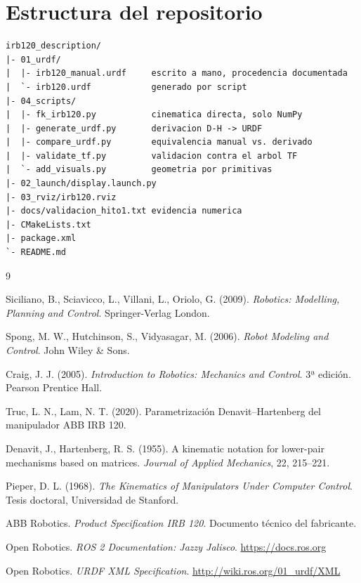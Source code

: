 \documentclass[11pt,a4paper]{article}
\begin{document}
\section{Estructura del repositorio}

\begin{lstlisting}[caption={Organización de archivos}]
irb120_description/
|- 01_urdf/
|  |- irb120_manual.urdf     escrito a mano, procedencia documentada
|  `- irb120.urdf            generado por script
|- 04_scripts/
|  |- fk_irb120.py           cinematica directa, solo NumPy
|  |- generate_urdf.py       derivacion D-H -> URDF
|  |- compare_urdf.py        equivalencia manual vs. derivado
|  |- validate_tf.py         validacion contra el arbol TF
|  `- add_visuals.py         geometria por primitivas
|- 02_launch/display.launch.py
|- 03_rviz/irb120.rviz
|- docs/validacion_hito1.txt evidencia numerica
|- CMakeLists.txt
|- package.xml
`- README.md
\end{lstlisting}

\begin{thebibliography}{9}

Siciliano, B., Sciavicco, L., Villani, L., Oriolo, G. (2009).
\emph{Robotics: Modelling, Planning and Control}. Springer-Verlag London.

Spong, M. W., Hutchinson, S., Vidyasagar, M. (2006).
\emph{Robot Modeling and Control}. John Wiley \& Sons.

Craig, J. J. (2005). \emph{Introduction to Robotics: Mechanics and
Control}. 3ª edición. Pearson Prentice Hall.

Truc, L. N., Lam, N. T. (2020). Parametrización Denavit--Hartenberg del
manipulador ABB IRB 120.

Denavit, J., Hartenberg, R. S. (1955). A kinematic notation for
lower-pair mechanisms based on matrices. \emph{Journal of Applied
Mechanics}, 22, 215--221.

Pieper, D. L. (1968). \emph{The Kinematics of Manipulators Under
Computer Control}. Tesis doctoral, Universidad de Stanford.

ABB Robotics. \emph{Product Specification IRB 120}. Documento técnico
del fabricante.

Open Robotics. \emph{ROS 2 Documentation: Jazzy Jalisco}.
\url{https://docs.ros.org}

Open Robotics. \emph{URDF XML Specification}.
\url{http://wiki.ros.org/01_urdf/XML}

\end{thebibliography}
\end{document}
